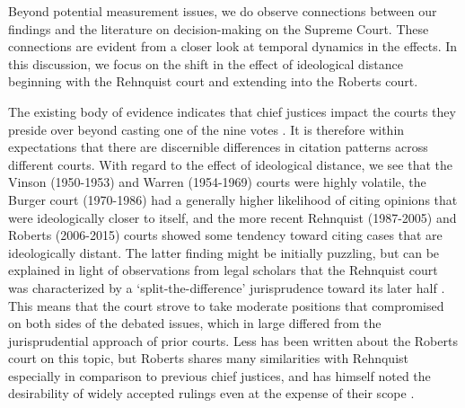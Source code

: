 \documentclass[headsepline=true, abstracton]{scrartcl}
\begin{document}
Beyond potential measurement issues, we do observe connections between our findings and the literature on decision-making on the Supreme Court. These connections are evident from a closer look at temporal dynamics in the effects. In this discussion, we focus on the shift in the effect of ideological distance beginning with the Rehnquist court and extending into the Roberts court. 

The existing body of evidence indicates that chief justices impact the courts they preside over beyond casting one of the nine votes \citep{cross2005decisional,danelski2016chief}. It is therefore within expectations that there are discernible differences in citation patterns across different courts. With regard to the effect of ideological distance, we see that the Vinson (1950-1953) and Warren (1954-1969) courts were highly volatile, the Burger court (1970-1986) had a generally higher likelihood of citing opinions that were ideologically closer to itself, and the more recent Rehnquist (1987-2005) and Roberts (2006-2015) courts showed some tendency toward citing cases that are ideologically distant. The latter finding might be initially puzzling, but can be explained in light of observations from legal scholars that the Rehnquist court was characterized by a `split-the-difference' jurisprudence toward its later half \citep{wilkinson2005rehnquist,basiak2006roberts}. This means that the court strove to take moderate positions that compromised on both sides of the debated issues, which in large differed from the jurisprudential approach of prior courts. Less has been written about the Roberts court on this topic, but Roberts shares many similarities with Rehnquist especially in comparison to previous chief justices, and has himself noted the desirability of widely accepted rulings even at the expense of their scope \citep{pomerance2018center,sunstein2008trimming}.
\end{document}
